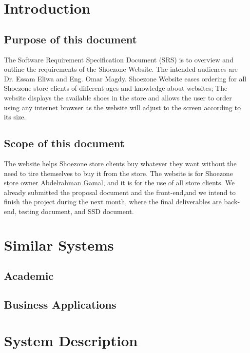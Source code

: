 \documentclass[12pt]{article}
\begin{document}
\section{Introduction}
\subsection{Purpose of this document}
The Software Requirement Specification Document (SRS) is to overview and outline the requirements of the Shoezone Website. The intended audiences are Dr. Essam Eliwa and Eng. Omar Magdy. Shoezone Website eases ordering for all Shoezone store clients of different ages and knowledge about websites; The website displays the available shoes in the store and allows the user to order using any internet browser as the website will adjust to the screen according to its size.
\subsection{Scope of this document}
The website helps Shoezone store clients buy whatever they want without the need to tire themselves to buy it from the store. The website is for Shoezone store owner Abdelrahman Gamal, and it is for the use of all store clients.
We already submitted the proposal document and the front-end,and we intend to finish the project during the next month, where the final deliverables are back-end, testing document, and SSD document. 




\section{Similar Systems}
\subsection{Academic}
\cite{majid2015adaptation}

\subsection{Business Applications}
\section{System Description}
\end{document}
